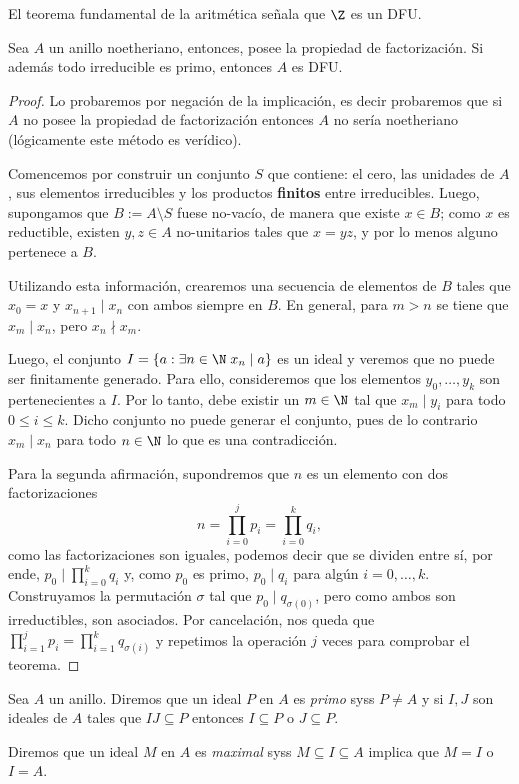 \documentclass[11pt,oneside]{book}
\begin{document}
El teorema fundamental de la aritmética señala que $\Z$ es un DFU.
\begin{thm}\label{thm:factorization-in-noetherian}
Sea $A$ un anillo noetheriano, entonces, posee la propiedad de factorización. Si además todo irreducible es primo, entonces $A$ es DFU.
\end{thm}
\begin{proof}
Lo probaremos por negación de la implicación, es decir probaremos que si $A$ no posee la propiedad de factorización entonces $A$ no sería noetheriano (lógicamente este método es verídico).

Comencemos por construir un conjunto $S$ que contiene: el cero, las unidades de $A$, sus elementos irreducibles y los productos \textbf{finitos} entre irreducibles. Luego, supongamos que $B:=A\setminus S$ fuese no-vacío, de manera que existe $x\in B$; como $x$ es reductible, existen $y,z\in A$ no-unitarios tales que $x=yz$, y por lo menos alguno pertenece a $B$.

Utilizando esta información, crearemos una secuencia de elementos de $B$ tales que $x_0=x$ y $x_{n+1}\mid x_n$ con ambos siempre en $B$. En general, para $m\gt n$ se tiene que $x_m\mid x_n$, pero $x_n\nmid x_m$.

Luego, el conjunto $I=\{a:\exists n\in\N\;x_n\mid a\}$ es un ideal y veremos que no puede ser finitamente generado. Para ello, consideremos que los elementos $y_0,\dots,y_k$ son pertenecientes a $I$. Por lo tanto, debe existir un $m\in\N$ tal que $x_m\mid y_i$ para todo $0\leq i\leq k$. Dicho conjunto no puede generar el conjunto, pues de lo contrario $x_m\mid x_n$ para todo $n\in\N$ lo que es una contradicción.

Para la segunda afirmación, supondremos que $n$ es un elemento con dos factorizaciones
$$n=\prod_{i=0}^j p_i=\prod_{i=0}^k q_i,$$
como las factorizaciones son iguales, podemos decir que se dividen entre sí, por ende, $p_0\mid\prod_{i=0}^k q_i$ y, como $p_0$ es primo, $p_0\mid q_i$ para algún $i=0,\dots,k$. Construyamos la permutación $\sigma$ tal que $p_0\mid q_{\sigma(0)}$, pero como ambos son irreductibles, son asociados. Por cancelación, nos queda que $\prod_{i=1}^j p_i=\prod_{i=1}^k q_{\sigma(i)}$ y repetimos la operación $j$ veces para comprobar el teorema.
\end{proof}
\begin{mydef}
Sea $A$ un anillo. Diremos que un ideal $P$ en $A$ es \textit{primo} syss $P\neq A$ y si $I,J$ son ideales de $A$ tales que $IJ\subseteq P$ entonces $I\subseteq P$ o $J\subseteq P$.

Diremos que un ideal $M$ en $A$ es \textit{maximal} syss $M\subseteq I\subseteq A$ implica que $M=I$ o $I=A$.
\end{mydef}
\end{document}
